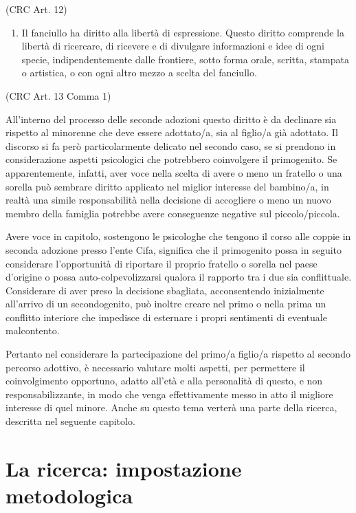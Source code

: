 \documentclass[12pt,oneside,svgnames]{memoir}
\begin{document}
(CRC Art. 12)

\begin{enumerate}
\def\labelenumi{\arabic{enumi}.}
\itemsep1pt\parskip0pt
\item
  Il fanciullo ha diritto alla libertà di espressione. Questo diritto
  comprende la libertà di ricercare, di ricevere e di divulgare
  informazioni e idee di ogni specie, indipendentemente dalle frontiere,
  sotto forma orale, scritta, stampata o artistica, o con ogni altro
  mezzo a scelta del fanciullo.
\end{enumerate}

(CRC Art. 13 Comma 1)

All'interno del processo delle seconde adozioni questo diritto è da
declinare sia rispetto al minorenne che deve essere adottato/a, sia al
figlio/a già adottato. Il discorso si fa però particolarmente delicato
nel secondo caso, se si prendono in considerazione aspetti psicologici
che potrebbero coinvolgere il primogenito. Se apparentemente, infatti,
aver voce nella scelta di avere o meno un fratello o una sorella può
sembrare diritto applicato nel miglior interesse del bambino/a, in
realtà una simile responsabilità nella decisione di accogliere o meno un
nuovo membro della famiglia potrebbe avere conseguenze negative sul
piccolo/piccola.

Avere voce in capitolo, sostengono le psicologhe che tengono il corso
alle coppie in seconda adozione presso l'ente Cifa, significa che il
primogenito possa in seguito considerare l'opportunità di riportare il
proprio fratello o sorella nel paese d'origine o possa
auto-colpevolizzarsi qualora il rapporto tra i due sia conflittuale.
Considerare di aver preso la decisione sbagliata, acconsentendo
inizialmente all'arrivo di un secondogenito, può inoltre creare nel
primo o nella prima un conflitto interiore che impedisce di esternare i
propri sentimenti di eventuale malcontento.

Pertanto nel considerare la partecipazione del primo/a figlio/a rispetto
al secondo percorso adottivo, è necessario valutare molti aspetti, per
permettere il coinvolgimento opportuno, adatto all'età e alla
personalità di questo, e non responsabilizzante, in modo che venga
effettivamente messo in atto il migliore interesse di quel minore. Anche
su questo tema verterà una parte della ricerca, descritta nel seguente
capitolo.

\chapter{La ricerca: impostazione
metodologica}\label{la-ricerca-impostazione-metodologica}
\end{document}
